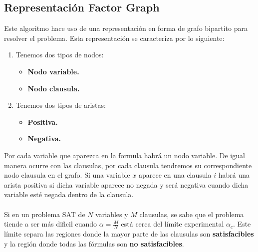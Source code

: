 \subsection{Representación Factor Graph}
Este algoritmo hace uso de una representación en forma de grafo bipartito para resolver el problema. Esta representación se caracteriza por lo siguiente:
\begin{enumerate}
	\item Tenemos dos tipos de nodos:
	\begin{itemize}
		\item \textbf{Nodo variable.}
		\item \textbf{Nodo clausula.}
	\end{itemize}
	\item Tenemos dos tipos de aristas:
	\begin{itemize}
		\item \textbf{Positiva.}
		\item \textbf{Negativa.}
	\end{itemize}
\end{enumerate}
Por cada variable que aparezca en la formula habrá un nodo variable. De igual manera ocurre con las clausulas, por cada clausula tendremos su correspondiente nodo clausula en el grafo. 
Si una variable $x$ aparece en una clausula $i$ habrá una arista positiva si dicha variable aparece no negada y será negativa cuando dicha variable esté negada dentro de la clausula.\\\\
Si en un problema SAT de $N$ variables y $M$ clausulas, se sabe que el problema tiende a ser más dificil cuando $\alpha = \frac{M}{N}$ está cerca del límite experimental $\alpha_c$. Este límite separa las regiones donde la mayor parte de las clausulas son \textbf{satisfacibles} y la región donde todas las fórmulas son \textbf{no satisfacibles}.\\

